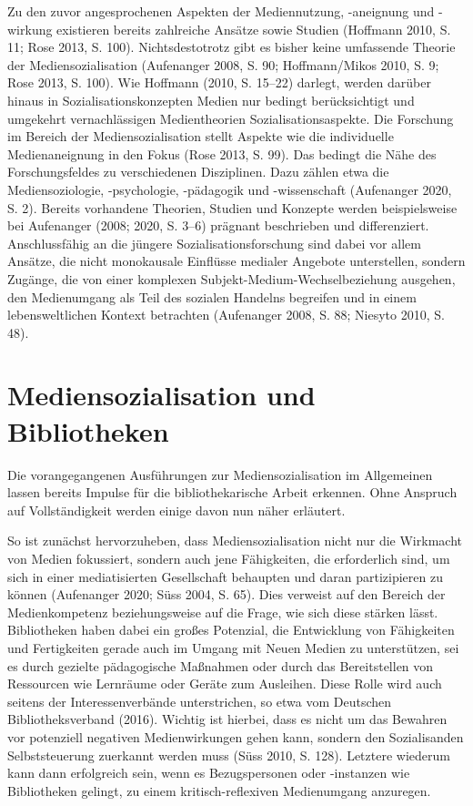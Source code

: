 \documentclass[a4paper,
fontsize=11pt,
oneside,
numbers=noperiodatend,
parskip=half-,
bibliography=totoc,
final
]{scrartcl}
\begin{document}
Zu den zuvor angesprochenen Aspekten der Mediennutzung, -aneignung und
-wirkung existieren bereits zahlreiche Ansätze sowie Studien (Hoffmann
2010, S. 11; Rose 2013, S. 100). Nichtsdestotrotz gibt es bisher keine
umfassende Theorie der Mediensozialisation (Aufenanger 2008, S. 90;
Hoffmann/Mikos 2010, S. 9; Rose 2013, S. 100). Wie Hoffmann (2010, S.
15--22) darlegt, werden darüber hinaus in Sozialisationskonzepten Medien
nur bedingt berücksichtigt und umgekehrt vernachlässigen Medientheorien
Sozialisationsaspekte. Die Forschung im Bereich der Mediensozialisation
stellt Aspekte wie die individuelle Medienaneignung in den Fokus (Rose
2013, S. 99). Das bedingt die Nähe des Forschungsfeldes zu verschiedenen
Disziplinen. Dazu zählen etwa die Mediensoziologie, -psychologie,
-pädagogik und -wissenschaft (Aufenanger 2020, S. 2). Bereits vorhandene
Theorien, Studien und Konzepte werden beispielsweise bei Aufenanger
(2008; 2020, S. 3--6) prägnant beschrieben und differenziert.
Anschlussfähig an die jüngere Sozialisationsforschung sind dabei vor
allem Ansätze, die nicht monokausale Einflüsse medialer Angebote
unterstellen, sondern Zugänge, die von einer komplexen
Subjekt-Medium-Wechselbeziehung ausgehen, den Medienumgang als Teil des
sozialen Handelns begreifen und in einem lebensweltlichen Kontext
betrachten (Aufenanger 2008, S. 88; Niesyto 2010, S. 48).

\hypertarget{mediensozialisation-und-bibliotheken}{%
\section{Mediensozialisation und
Bibliotheken}\label{mediensozialisation-und-bibliotheken}}

Die vorangegangenen Ausführungen zur Mediensozialisation im Allgemeinen
lassen bereits Impulse für die bibliothekarische Arbeit erkennen. Ohne
Anspruch auf Vollständigkeit werden einige davon nun näher erläutert.

So ist zunächst hervorzuheben, dass Mediensozialisation nicht nur die
Wirkmacht von Medien fokussiert, sondern auch jene Fähigkeiten, die
erforderlich sind, um sich in einer mediatisierten Gesellschaft
behaupten und daran partizipieren zu können (Aufenanger 2020; Süss 2004,
S. 65). Dies verweist auf den Bereich der Medienkompetenz
beziehungsweise auf die Frage, wie sich diese stärken lässt.
Bibliotheken haben dabei ein großes Potenzial, die Entwicklung von
Fähigkeiten und Fertigkeiten gerade auch im Umgang mit Neuen Medien zu
unterstützen, sei es durch gezielte pädagogische Maßnahmen oder durch
das Bereitstellen von Ressourcen wie Lernräume oder Geräte zum
Ausleihen. Diese Rolle wird auch seitens der Interessenverbände
unterstrichen, so etwa vom Deutschen Bibliotheksverband (2016). Wichtig
ist hierbei, dass es nicht um das Bewahren vor potenziell negativen
Medienwirkungen gehen kann, sondern den Sozialisanden Selbststeuerung
zuerkannt werden muss (Süss 2010, S. 128). Letztere wiederum kann dann
erfolgreich sein, wenn es Bezugspersonen oder -instanzen wie
Bibliotheken gelingt, zu einem kritisch-reflexiven Medienumgang
anzuregen.
\end{document}
